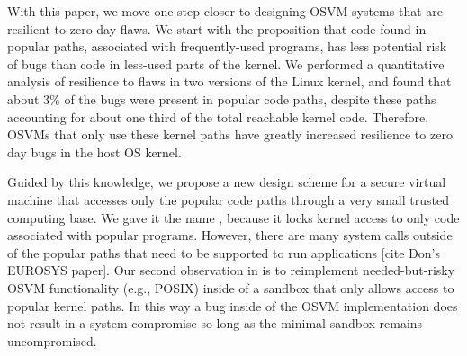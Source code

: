 
With this paper, we move one step closer to designing OSVM systems that are
resilient to zero day flaws.   We start
 with the proposition that code found in popular paths, associated with frequently-used programs,
has less potential risk of bugs than code in less-used parts of the kernel.
We performed a quantitative analysis of resilience
  to flaws in two versions of the Linux kernel, and
found that about 3\% of the bugs were present in popular code paths,
despite these paths accounting for about one third of the total reachable 
kernel code.  
Therefore, OSVMs that only use these kernel paths have
greatly increased resilience to zero day bugs in the host OS kernel.

Guided by this knowledge, we propose a new design scheme for a secure virtual machine that
accesses only the popular code paths through a very small trusted computing base.
We gave it the name \lip, because it locks kernel access to only code
associated with popular programs. %
However, there are many system calls outside of the popular paths that need to 
be supported to run applications [cite Don's EUROSYS paper].  Our second
observation in \lip is to reimplement needed-but-risky OSVM functionality 
(e.g., POSIX) inside of a 
sandbox that only allows access to popular kernel paths.  In this way a bug
inside of the OSVM implementation does not result in a system compromise
so long as the minimal sandbox remains uncompromised.

